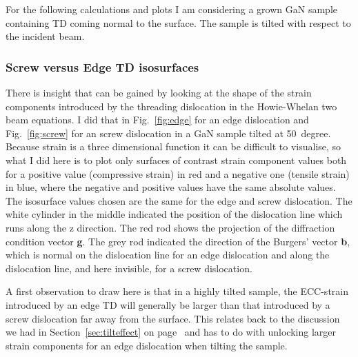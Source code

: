 For the following calculations and plots I am considering a \hkl[001] grown GaN sample containing TD coming normal to the surface. The sample is tilted with respect to the incident beam.


\subsubsection{Screw versus Edge TD isosurfaces}

There is insight that can be gained by looking at the shape of the strain components introduced by the threading dislocation in the Howie-Whelan two beam equations. I did that in Fig.~\ref{fig:edge} for an edge dislocation and   Fig.~\ref{fig:screw} for an screw dislocation in a GaN sample tilted at \SI{50}{degree}. Because strain is a three dimensional function it can be difficult to visualise, so what I did here is to plot only surfaces of contrast strain component values both for a positive value (compressive strain) in red and a negative one (tensile strain) in blue, where the negative and positive values have the same absolute values. The isosurface values chosen are the same for the edge and screw dislocation.  The white cylinder in the middle indicated the position of the dislocation line which runs along the z direction. The red rod shows the projection of the diffraction condition vector \textbf{g}. The grey rod indicated the direction of the Burgers' vector \textbf{b}, which is normal on the dislocation line for an edge dislocation and along the dislocation line, and here invisible, for a screw dislocation. 


A first observation to draw here is that in a highly tilted sample, the ECC-strain introduced by an edge TD will generally be larger than that introduced by a screw dislocation far away from the surface. This relates back to the discussion we had in Section~\ref{sec:tilteffect} on page~\pageref{sec:tilteffect} and has to do with unlocking larger strain components for an edge dislocation when tilting the sample. 



